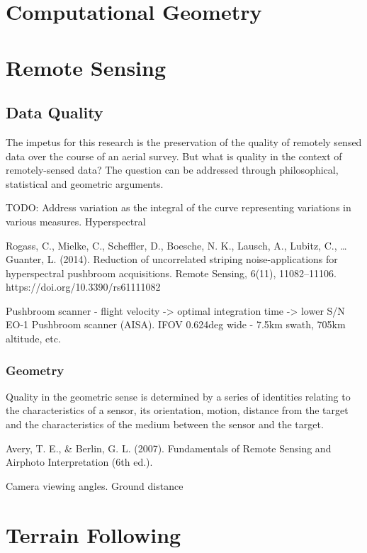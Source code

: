 \documentclass[10pt]{article}
\begin{document}
\section{Computational Geometry}

\section{Remote Sensing}

\subsection{Data Quality}

The impetus for this research is the preservation of the quality of remotely sensed data over the course of an aerial survey. But what is quality in the context of remotely-sensed data? The question can be addressed through philosophical, statistical and geometric arguments.

TODO: Address variation as the integral of the curve representing variations in various measures.
Hyperspectral

\cite{Rogass2014}
Rogass, C., Mielke, C., Scheffler, D., Boesche, N. K., Lausch, A., Lubitz, C., … Guanter, L. (2014). Reduction of uncorrelated striping noise-applications for hyperspectral pushbroom acquisitions. Remote Sensing, 6(11), 11082–11106. https://doi.org/10.3390/rs61111082

Pushbroom scanner - flight velocity -> optimal integration time -> lower S/N
EO-1 Pushbroom scanner (AISA).
IFOV 0.624deg wide - 7.5km swath, 705km altitude, etc.


\subsubsection{Geometry}

Quality in the geometric sense is determined by a series of identities relating to the characteristics of a sensor, its orientation, motion, distance from the target and the characteristics of the medium between the sensor and the target.

\cite{Avery2007}
Avery, T. E., \& Berlin, G. L. (2007). Fundamentals of Remote Sensing and Airphoto Interpretation (6th ed.).

Camera viewing angles.
Ground distance

\section{Terrain Following}
\end{document}
